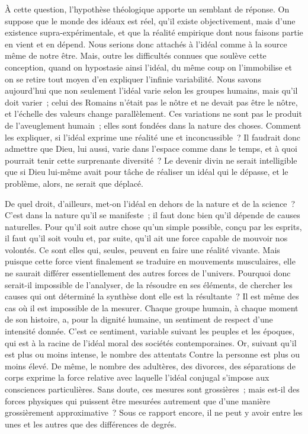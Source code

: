 \documentclass[french,twoside]{book} %
\begin{document}
À cette question, l’hypothèse théologique apporte un semblant de réponse. On suppose que le monde des idéaux est réel, qu’il existe objectivement, mais d’une existence supra-expérimentale, et que la réalité empirique dont nous faisons partie en vient et en dépend. Nous serions donc attachés à l’idéal comme à la source même de notre être. Mais, outre les difficultés connues que soulève cette conception, quand on hypostasie ainsi l’idéal, du même coup on l’immobilise et on se retire tout moyen d’en expliquer l’infinie variabilité. Nous savons aujourd’hui que non seulement l’idéal varie selon les groupes humains, mais qu’il doit varier ; celui des Romains n’était pas le nôtre et ne devait pas être le nôtre, et l’échelle des valeurs change parallèlement. Ces variations ne sont pas le produit de l’aveuglement humain ; elles sont fondées dans la nature des choses. Comment les expliquer, si l’idéal exprime une réalité une et inconcussible ? Il faudrait donc admettre que Dieu, lui aussi, varie dans l’espace comme dans le temps, et à quoi pourrait tenir cette surprenante diversité ? Le devenir divin ne serait intelligible que si Dieu lui-même avait pour tâche de réaliser un idéal qui le dépasse, et le problème, alors, ne serait que déplacé.\par
De quel droit, d’ailleurs, met-on l’idéal en dehors de la nature et de la science ? C’est dans la nature qu’il se manifeste ; il faut donc bien qu’il dépende de causes naturelles. Pour qu’il soit autre chose qu’un simple possible, conçu par les esprits, il faut qu’il soit voulu et, par suite, qu’il ait une force capable de mouvoir nos volontés. Ce sont elles qui, seules, peuvent en faire une réalité vivante. Mais puisque cette force vient finalement se traduire en mouvements musculaires, elle ne saurait différer essentiellement des autres forces de l’univers. Pourquoi donc serait-il impossible de l’analyser, de la résoudre en ses éléments, de chercher les causes qui ont déterminé la synthèse dont elle est la résultante ? Il est même des cas où il est impossible de la mesurer. Chaque groupe humain, à chaque moment de son histoire, a, pour la dignité humaine, un sentiment de respect d’une intensité donnée. C’est ce sentiment, variable suivant les peuples et les époques, qui est à la racine de l’idéal moral des sociétés contemporaines. Or, suivant qu’il est plus ou moins intense, le nombre des attentats Contre la personne est plus ou moins élevé. De même, le nombre des adultères, des divorces, des séparations de corps exprime la force relative avec laquelle l’idéal conjugal s’impose aux consciences particulières. Sans doute, ces mesures sont grossières ; mais est-il des forces physiques qui puissent être mesurées autrement que d’une manière grossièrement approximative ? Sous ce rapport encore, il ne peut y avoir entre les unes et les autres que des différences de degrés.\par
\end{document}
